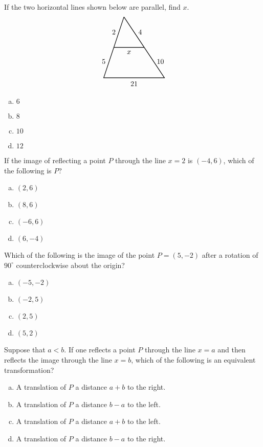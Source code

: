 \documentclass[12pt,letterpaper]{exam}
\begin{document}
\begin{questions}
\question If the two horizontal lines shown below are parallel, find $x$.
	\[
	\begin{tikzpicture}
	\draw[line width=0.03cm] (0,3) -- (-1,0) -- (2,0) -- (0,3);
	\draw[line width=0.03cm] (-0.5,1.5) -- (1,1.5);
	\node at (0.25,1.25) {$x$};
	\node at (0.5,-0.3) {$21$};
	\node at (-0.5,2.25) {$2$};
	\node at (0.8,2.25) {$4$};
	\node at (-1,0.8) {$5$};

	\node at (1.8,0.8) {$10$};
	\end{tikzpicture}
	\]

\begin{enumerate}[(a)]
\item $6$
\item $8$
\item $10$
\item $12$
\end{enumerate} \vfill



\question If the image of reflecting a point $P$ through the line $x= 2$ is $(-4, 6)$, which of the following is $P$?
	\begin{enumerate}[(a)]
	\item $(2, 6)$
	\item $(8, 6)$
	\item $(-6, 6)$
	\item $(6, -4)$
	\end{enumerate} \vfill



\newpage



\question Which of the following is the image of the point $P= (5, -2)$ after a rotation of $90^\circ$ counterclockwise about the origin?
	\begin{enumerate}[(a)]
	\item $(-5, -2)$
	\item $(-2, 5)$
	\item $(2, 5)$
	\item $(5, 2)$
	\end{enumerate} \vfill



\question Suppose that $a < b$. If one reflects a point $P$ through the line $x= a$ and then reflects the image through the line $x= b$, which of the following is an equivalent transformation? 
	\begin{enumerate}[(a)]
	\item A translation of $P$ a distance $a + b$ to the right. 
	\item A translation of $P$ a distance $b - a$ to the left. 
	\item A translation of $P$ a distance $a + b$ to the left.  
	\item A translation of $P$ a distance $b - a$ to the right. 
	\end{enumerate} \vfill
	



\end{questions}
\end{document}
